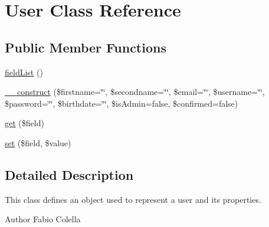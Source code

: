 \hypertarget{classUser}{\section{User Class Reference}
\label{classUser}
}
\subsection*{Public Member Functions}
\begin{DoxyCompactItemize}
\item 
\hyperlink{classUser_a06c940ee40777907844d9bd01ed20e2f}{field\+List} ()
\item 
\hyperlink{classUser_a3e0d1d6040692cac64fa423f21d50fa9}{\+\_\+\+\_\+construct} (\$firstname=\char`\"{}\char`\"{}, \$secondname=\char`\"{}\char`\"{}, \$email=\char`\"{}\char`\"{}, \$username=\char`\"{}\char`\"{}, \$password=\char`\"{}\char`\"{}, \$birthdate=\char`\"{}\char`\"{}, \$is\+Admin=false, \$confirmed=false)
\item 
\hyperlink{classUser_ac3880c17324e5d182bae56655365df85}{get} (\$field)
\item 
\hyperlink{classUser_af9023f37771e314acc0707060a449bb8}{set} (\$field, \$value)
\end{DoxyCompactItemize}


\subsection{Detailed Description}
This class defines an object used to represent a user and its properties.

\begin{DoxyAuthor}{Author}
Fabio Colella 
\end{DoxyAuthor}



